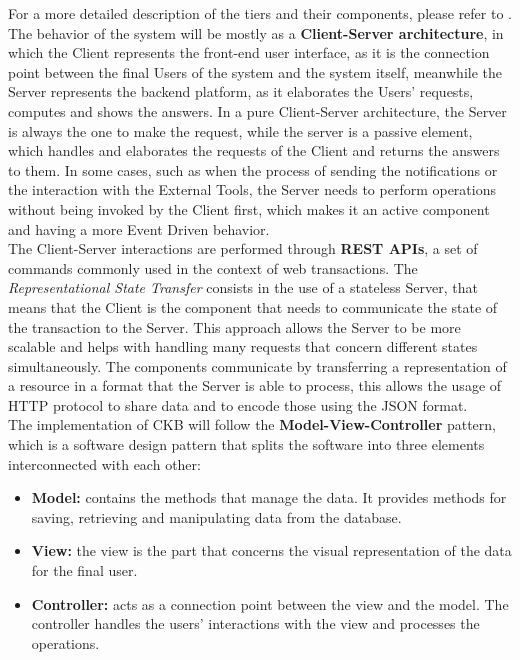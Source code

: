 For a more detailed description of the tiers and their components, please refer to .\\
The behavior of the system will be mostly as a \textbf{Client-Server architecture}, in which the Client represents the front-end user interface, as it is the connection point between the final Users of the system and the system itself, meanwhile the Server represents the backend platform, as it elaborates the Users’ requests, computes and shows the answers. In a pure Client-Server architecture, the Server is always the one to make the request, while the server is a passive element, which handles and elaborates the requests of the Client and returns the answers to them. In some cases, such as when the process of sending the notifications or the interaction with the External Tools, the Server needs to perform operations without being invoked by the Client first, which makes it an active component and having a more Event Driven behavior.
\\
The Client-Server interactions are performed through \textbf{REST APIs}, a set of commands commonly used in the context of web transactions. The \textit{Representational State Transfer} consists in the use of a stateless Server, that means that the Client is the component that needs to communicate the state of the transaction to the Server. This approach allows the Server to be more scalable and helps with handling many requests that concern different states simultaneously. The components communicate by transferring a representation of a resource in a format that the Server is able to process, this allows the usage of HTTP protocol to share data and to encode those using the JSON format.
\\
The implementation of CKB will follow the \textbf{Model-View-Controller} pattern, which is a software design pattern that splits the software into three elements interconnected with each other: 
\begin{itemize}
    \item \textbf{Model:} contains the methods that manage the data. It provides methods for saving, retrieving and manipulating data from the database.
    \item \textbf{View:} the view is the part that concerns the visual representation of the data for the final user.
    \item \textbf{Controller:} acts as a connection point between the view and the model. The controller handles the users’ interactions with the view and processes the operations.
\end{itemize}


